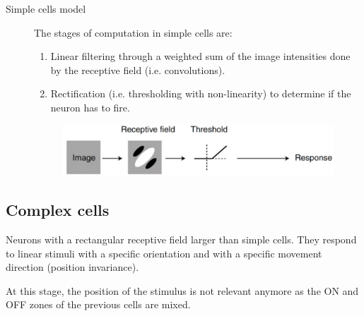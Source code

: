 \begin{description}
    \item[Simple cells model] 
        The stages of computation in simple cells are:
        \begin{enumerate}
            \item Linear filtering through a weighted sum of the image intensities done by the receptive field (i.e. convolutions).
            \item Rectification (i.e. thresholding with non-linearity) to determine if the neuron has to fire.
        \end{enumerate}

        \begin{figure}[H]
            \centering
            \includegraphics[width=0.4\linewidth]{./img/simple_cell_model.png}
        \end{figure}
\end{description}


\subsection{Complex cells}

Neurons with a rectangular receptive field larger than simple cells.
They respond to linear stimuli with a specific orientation and with a specific movement direction (position invariance).

\begin{remark}
    At this stage, the position of the stimulus is not relevant anymore as the ON and OFF zones of the previous cells are mixed.
\end{remark}

